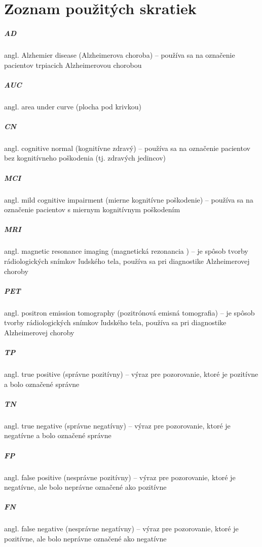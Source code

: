 \chapter*{Zoznam použitých skratiek \label{sec:dictionary}}

\paragraph{AD} angl. Alzhemier disease (Alzheimerova choroba) -- používa sa na označenie pacientov trpiacich Alzheimerovou chorobou
\paragraph{AUC} angl. area under curve (plocha pod krivkou)
\paragraph{CN} angl. cognitive normal (kognitívne zdravý) -- používa sa na označenie pacientov bez kognitívneho poškodenia (tj. zdravých jedincov)
\paragraph{MCI} angl. mild cognitive impairment (mierne kognitívne poškodenie) -- používa sa na označenie pacientov s miernym kognitívnym poškodením
\paragraph{MRI} angl. magnetic resonance imaging  (magnetická rezonancia ) -- je spôsob tvorby rádiologických snímkov ľudského tela, používa sa pri diagnostike Alzheimerovej choroby
\paragraph{PET} angl. positron emission tomography  (pozitrónová emisná tomografia) -- je spôsob tvorby rádiologických snímkov ľudského tela, používa sa pri diagnostike Alzheimerovej choroby
\paragraph{TP} angl. true positive (správne pozitívny) -- výraz pre pozorovanie, ktoré je pozitívne a bolo označené správne
\paragraph{TN} angl. true negative (správne negatívny) -- výraz pre pozorovanie, ktoré je negatívne a bolo označené správne
\paragraph{FP} angl. false positive (nesprávne pozitívny) -- výraz pre pozorovanie, ktoré je negatívne, ale bolo neprávne označené ako pozitívne
\paragraph{FN} angl. false negative (nesprávne negatívny) -- výraz pre pozorovanie, ktoré je pozitívne, ale bolo neprávne označené ako negatívne